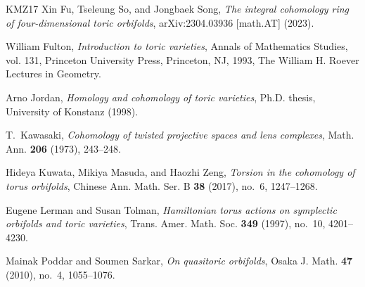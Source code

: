 \documentclass[10pt]{amsart}
\theoremstyle{plain}
\theoremstyle{definition}
\numberwithin{equation}{section}
\begin{document}
\begin{thebibliography}{KMZ17}
Xin Fu, Tseleung So, and Jongbaek Song, \emph{The integral cohomology ring of
  four-dimensional toric orbifolds}, arXiv:2304.03936 [math.AT] (2023).

William Fulton, \emph{Introduction to toric varieties}, Annals of Mathematics
  Studies, vol. 131, Princeton University Press, Princeton, NJ, 1993, The
  William H. Roever Lectures in Geometry. 

Arno Jordan, \emph{Homology and cohomology of toric varieties}, Ph.D. thesis,
  University of Konstanz (1998).

T.~Kawasaki, \emph{Cohomology of twisted projective spaces and lens complexes},
  Math. Ann. \textbf{206} (1973), 243--248.

Hideya Kuwata, Mikiya Masuda, and Haozhi Zeng, \emph{Torsion in the cohomology
  of torus orbifolds}, Chinese Ann. Math. Ser. B \textbf{38} (2017), no.~6,
  1247--1268. 

Eugene Lerman and Susan Tolman, \emph{Hamiltonian torus actions on symplectic
  orbifolds and toric varieties}, Trans. Amer. Math. Soc. \textbf{349} (1997),
  no.~10, 4201--4230. 

Mainak Poddar and Soumen Sarkar, \emph{On quasitoric orbifolds}, Osaka J. Math.
  \textbf{47} (2010), no.~4, 1055--1076.

\end{thebibliography}
\end{document}
